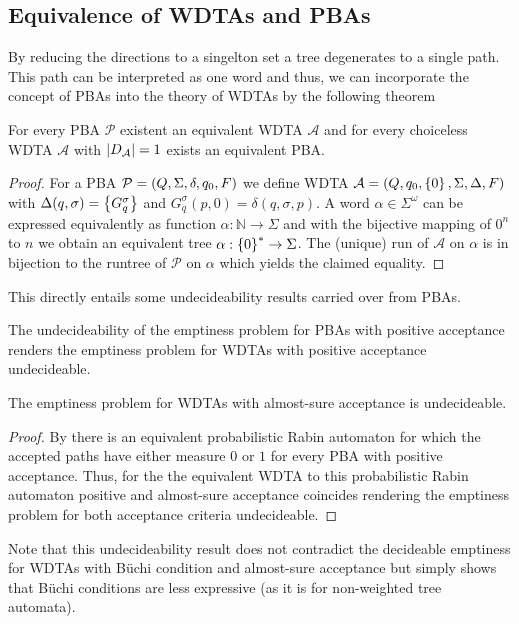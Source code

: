 \subsection{Equivalence of \acp*{WDTA} and \acp*{PBA}}
By reducing the directions to a singelton set a tree degenerates to a single
path. This path can be interpreted as one word and thus, we can incorporate the
concept of \acp{PBA} into the theory of \acp{WDTA} by the following theorem
\begin{theorem}
  For every \ac{PBA} $\mathcal{P}$ existent an equivalent \ac{WDTA}
  $\mathcal{A}$ and for every choiceless \ac{WDTA} $\mathcal{A}$ with
  $\left\vert{D_{\mathcal{A}}}\right\vert = 1$ exists an equivalent \ac{PBA}.
  \label{theorem:pbaequiv}
\end{theorem}
\begin{proof}
  For a \ac{PBA} $\mathcal{P} = \left(Q, \Sigma, \delta, q_{0}, F\right)$ we define
  \ac{WDTA} $\mathcal{A} = \left(Q, q_{0}, \left\{0\right\}, \Sigma, \Delta, F\right)$ with
  $\Delta(q,\sigma) = \left\{G_{q}^{\sigma}\right\}$ and
  $G_{q}^{\sigma}(p, 0) = \delta(q, \sigma, p)$. A word
  $\alpha\in\Sigma^{\omega}$ can be expressed equivalently as function
  $\alpha:\mathbb{N}\rightarrow\Sigma$ and with the bijective mapping of $0^n$
  to $n$ we obtain an equivalent tree $\alpha:\left\{0\right\}^{*}\rightarrow\Sigma$.
  The (unique) run of $\mathcal{A}$ on $\alpha$ is in bijection to the runtree
  of $\mathcal{P}$ on $\alpha$ which yields the claimed equality.
\end{proof}
This directly entails some undecideability results carried over from \acp{PBA}.
\begin{corollary}
  The undecideability of the emptiness problem for \acp{PBA} with positive
  acceptance \cite{Groesser} renders the emptiness problem for \acp{WDTA} with
  positive acceptance undecideable.
\end{corollary}
\begin{corollary}
  The emptiness problem for \acp{WDTA} with almost-sure acceptance is
  undecideable.
\end{corollary}
\begin{proof}
  By \cite[Proof of Theorem 1]{DecProblemsForProbAuto} there is an equivalent
  probabilistic Rabin automaton for which the accepted paths have either
  measure $0$ or $1$ for every \ac{PBA} with positive acceptance. Thus, for the
  the equivalent \ac{WDTA} to this probabilistic Rabin automaton positive and
  almost-sure acceptance coincides rendering the emptiness problem for both
  acceptance criteria undecideable.
\end{proof}
Note that this undecideability result does not contradict the decideable
emptiness for \acp{WDTA} with Büchi condition and almost-sure acceptance but
simply shows that Büchi conditions are less expressive (as it is for
non-weighted tree automata).

